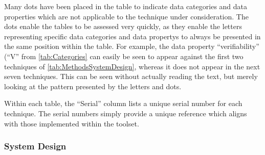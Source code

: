 Many dots have been placed in the table to indicate data categories and data properties which are not applicable to the technique under consideration. The dots enable the tables to be assessed very quickly, as they enable the letters representing specific data categories and \glspl{data property} to always be presented in the same position within the table. For example, the \gls{data property} ``\gls{verifiability}'' (``V'' from \autoref{tab:Categories} can easily be seen to appear against the first two techniques of \autoref{tab:MethodsSystemDesign}, whereas it does not appear in the next seven techniques. This can be seen without actually reading the text, but merely looking at the pattern presented by the letters and dots. 

Within each table, the ``Serial'' column lists a unique serial number for each technique. The serial numbers simply provide a unique reference which aligns with those implemented within the toolset.

\subsubsection{System Design}

